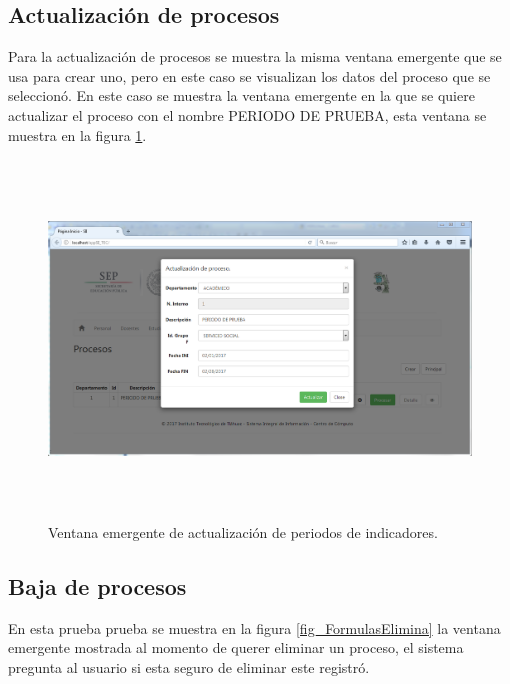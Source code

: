 			\subsection{Actualizaci\'on de procesos}

			Para la actualizaci\'on de procesos se muestra la misma ventana emergente que se usa para crear uno, pero en este caso se visualizan los datos del proceso que se seleccion\'o. En este caso se muestra la ventana emergente en la que se quiere actualizar el proceso con el nombre PERIODO DE PRUEBA, esta ventana se muestra en la figura \ref{fig_ProcesoActualiza}.

			\begin{figure}[]
		        \centering
		        \includegraphics[width=16cm, height=9.5cm]{figuras/ProcesoActualiza}
		        \caption{Ventana emergente de actualizaci\'on de periodos de indicadores.}
		        \label{fig_ProcesoActualiza}
		    \end{figure}

		    \subsection{Baja de procesos}

		    En esta prueba prueba se muestra en la figura \ref{fig_FormulasElimina} la ventana emergente mostrada al momento de querer eliminar un proceso, el sistema pregunta al usuario si esta seguro de eliminar este registr\'o.\\

